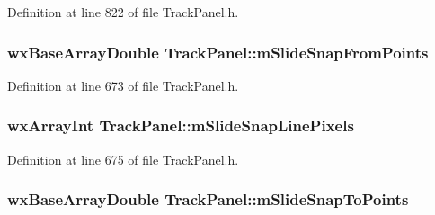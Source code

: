 Definition at line 822 of file Track\+Panel.\+h.

\subsubsection[{\texorpdfstring{m\+Slide\+Snap\+From\+Points}{mSlideSnapFromPoints}}]{\setlength{\rightskip}{0pt plus 5cm}wx\+Base\+Array\+Double Track\+Panel\+::m\+Slide\+Snap\+From\+Points\hspace{0.3cm}{\ttfamily [protected]}}\hypertarget{class_track_panel_a305e2edccc89bf410007a37d88e22e9a}{}\label{class_track_panel_a305e2edccc89bf410007a37d88e22e9a}


Definition at line 673 of file Track\+Panel.\+h.

\subsubsection[{\texorpdfstring{m\+Slide\+Snap\+Line\+Pixels}{mSlideSnapLinePixels}}]{\setlength{\rightskip}{0pt plus 5cm}wx\+Array\+Int Track\+Panel\+::m\+Slide\+Snap\+Line\+Pixels\hspace{0.3cm}{\ttfamily [protected]}}\hypertarget{class_track_panel_a3e1c2d2da99cc15060db22e2e07bd8ee}{}\label{class_track_panel_a3e1c2d2da99cc15060db22e2e07bd8ee}


Definition at line 675 of file Track\+Panel.\+h.

\subsubsection[{\texorpdfstring{m\+Slide\+Snap\+To\+Points}{mSlideSnapToPoints}}]{\setlength{\rightskip}{0pt plus 5cm}wx\+Base\+Array\+Double Track\+Panel\+::m\+Slide\+Snap\+To\+Points\hspace{0.3cm}{\ttfamily [protected]}}\hypertarget{class_track_panel_a7068bd24d1e8c6fb60ca3b21cf918a8d}{}\label{class_track_panel_a7068bd24d1e8c6fb60ca3b21cf918a8d}


